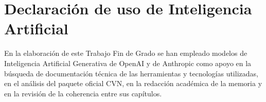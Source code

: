 \documentclass[12pt, a4paper]{book}
\begin{document}


\setmainfont{TeX Gyre Termes}
\frontmatter 


\singlespacing     

\tableofcontents	%
\listoffigures		%
\listoftables		%
\listofcodes	    %
\cleardoublepage

\onehalfspacing 

\mainmatter
\pagestyle{fancy}












\cleardoublepage



\cleardoublepage
\chapter*{Declaración de uso de Inteligencia Artificial}

En la elaboración de este Trabajo Fin de Grado se han empleado modelos de
Inteligencia Artificial Generativa de OpenAI y de Anthropic como apoyo en la
búsqueda de documentación técnica de las herramientas y tecnologías
utilizadas, en el análisis del paquete oficial CVN, en la redacción
académica de la memoria y en la revisión de la coherencia entre sus
capítulos.
\end{document}
